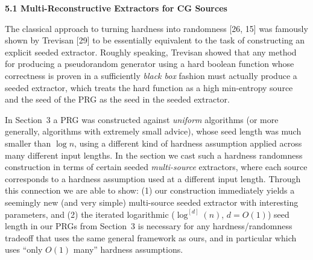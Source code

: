 \documentclass[10pt,a4paper]{article}
\begin{document}
\par\medskip\noindent\textbf{
5.1 Multi-Reconstructive Extractors for CG Sources}\par




The classical approach to turning hardness into randomness [26, 15] was famously shown by Trevisan [29] to be essentially equivalent to the task of constructing an explicit seeded extractor. Roughly speaking, Trevisan showed that any method for producing a pseudorandom generator using a hard boolean function whose correctness is proven in a sufficiently \emph{black box} fashion must actually produce a seeded extractor, which treats the hard function as a high min-entropy source and the seed of the PRG as the seed in the seeded extractor.\par




In Section 3 a PRG was constructed against \emph{uniform} algorithms (or more generally, algorithms with extremely small advice), whose seed length was much smaller than $\log n$, using a different kind of hardness assumption applied across many different input lengths. In the section we cast such a hardness randomness construction in terms of certain seeded \emph{multi-source} extractors, where each source corresponds to a hardness assumption used at a different input length. Through this connection we are able to show: (1) our construction immediately yields a seemingly new (and very simple) multi-source seeded extractor with interesting parameters, and (2) the iterated logarithmic ($\log^{[d]}(n)$, $d=O(1)$) seed length in our PRGs from Section 3 is necessary for any hardness/randomness tradeoff that uses the same general framework as ours, and in particular which uses “only $O(1)$ many” hardness assumptions.\par
\end{document}
